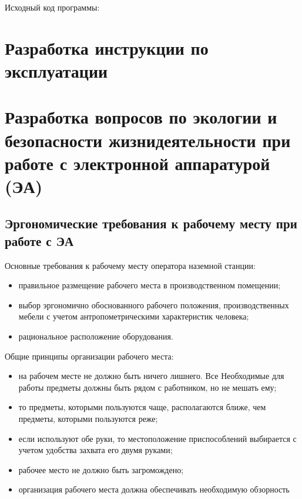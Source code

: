 \documentclass[a4paper,12pt]{report} %
\begin{document}
Исходный код программы:





\newpage
\chapter{Разработка инструкции по эксплуатации}
\newpage

\chapter{Разработка вопросов по экологии и безопасности жизнидеятельности при
  работе с электронной аппаратурой (ЭА)} %
\section{Эргономические требования к рабочему месту при работе с ЭА}

Основные требования к рабочему месту оператора наземной станции:

\begin{itemize}
\item правильное размещение рабочего места в производственном помещении; 
\item выбор эргономично обоснованного рабочего положения, производственных
  мебели с учетом антропометрическими характеристик человека; 
\item рациональное расположение оборудования. 
\end{itemize}

Общие принципы организации рабочего места:

\begin{itemize}
\item на рабочем месте не должно быть ничего лишнего. Все Необходимые для работы
  предметы должны быть рядом с работником, но не мешать ему; 
\item то предметы, которыми пользуются чаще, располагаются ближе, чем предметы,
  которыми пользуются реже; 
\item если используют обе руки, то местоположение приспособлений выбирается с
  учетом удобства захвата его двумя руками; 
\item рабочее место не должно быть загромождено; 
\item организация рабочего места должна обеспечивать необходимую обзорность 
\end{itemize}
\end{document}
